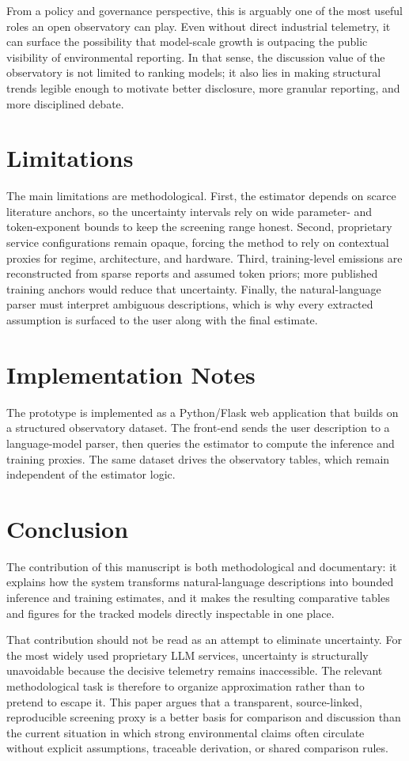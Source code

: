 \documentclass[runningheads]{llncs}
\begin{document}
From a policy and governance perspective, this is arguably one of the most useful roles an open observatory can play. Even without direct industrial telemetry, it can surface the possibility that model-scale growth is outpacing the public visibility of environmental reporting. In that sense, the discussion value of the observatory is not limited to ranking models; it also lies in making structural trends legible enough to motivate better disclosure, more granular reporting, and more disciplined debate.

\section{Limitations}
The main limitations are methodological. First, the estimator depends on scarce literature anchors, so the uncertainty intervals rely on wide parameter- and token-exponent bounds to keep the screening range honest. Second, proprietary service configurations remain opaque, forcing the method to rely on contextual proxies for regime, architecture, and hardware. Third, training-level emissions are reconstructed from sparse reports and assumed token priors; more published training anchors would reduce that uncertainty. Finally, the natural-language parser must interpret ambiguous descriptions, which is why every extracted assumption is surfaced to the user along with the final estimate.

\section{Implementation Notes}
The prototype is implemented as a Python/Flask web application that builds on a structured observatory dataset. The front-end sends the user description to a language-model parser, then queries the estimator to compute the inference and training proxies. The same dataset drives the observatory tables, which remain independent of the estimator logic.

\section{Conclusion}
The contribution of this manuscript is both methodological and documentary: it explains how the system transforms natural-language descriptions into bounded inference and training estimates, and it makes the resulting comparative tables and figures for the tracked models directly inspectable in one place.

That contribution should not be read as an attempt to eliminate uncertainty. For the most widely used proprietary LLM services, uncertainty is structurally unavoidable because the decisive telemetry remains inaccessible. The relevant methodological task is therefore to organize approximation rather than to pretend to escape it. This paper argues that a transparent, source-linked, reproducible screening proxy is a better basis for comparison and discussion than the current situation in which strong environmental claims often circulate without explicit assumptions, traceable derivation, or shared comparison rules.



\end{document}
